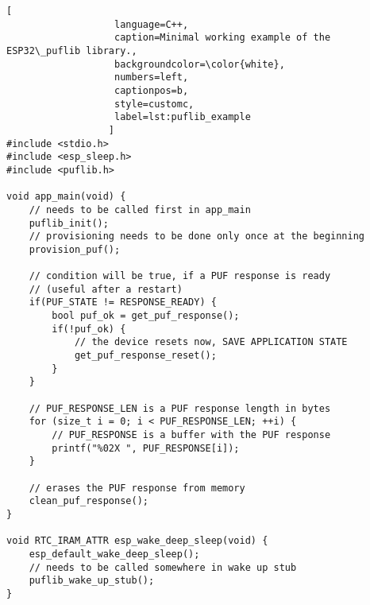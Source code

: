 \begin{lstlisting}[
                   language=C++,
                   caption=Minimal working example of the ESP32\_puflib library.,
                   backgroundcolor=\color{white},
                   numbers=left,
                   captionpos=b,
                   style=customc,
                   label=lst:puflib_example
                  ]
#include <stdio.h>
#include <esp_sleep.h>
#include <puflib.h>

void app_main(void) { 
    // needs to be called first in app_main
    puflib_init();
    // provisioning needs to be done only once at the beginning
    provision_puf();

    // condition will be true, if a PUF response is ready
    // (useful after a restart)
    if(PUF_STATE != RESPONSE_READY) {
        bool puf_ok = get_puf_response();
        if(!puf_ok) {
            // the device resets now, SAVE APPLICATION STATE
            get_puf_response_reset();
        }
    }

    // PUF_RESPONSE_LEN is a PUF response length in bytes
    for (size_t i = 0; i < PUF_RESPONSE_LEN; ++i) {
        // PUF_RESPONSE is a buffer with the PUF response
        printf("%02X ", PUF_RESPONSE[i]);
    }

    // erases the PUF response from memory
    clean_puf_response();
}

void RTC_IRAM_ATTR esp_wake_deep_sleep(void) {
    esp_default_wake_deep_sleep();
    // needs to be called somewhere in wake up stub
    puflib_wake_up_stub();
}
\end{lstlisting}

